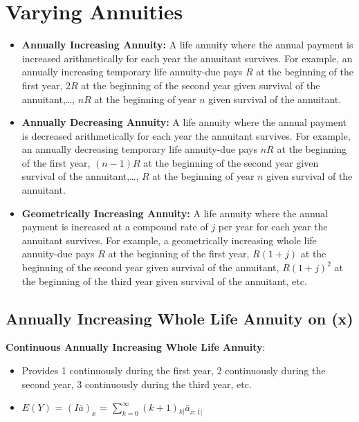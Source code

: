 \documentclass[]{book}
\begin{document}
\section{Varying Annuities}\label{varying-annuities}

\begin{itemize}
\item
  \textbf{Annually Increasing Annuity:} A life annuity where the annual
  payment is increased arithmetically for each year the annuitant
  survives. For example, an annually increasing temporary life
  annuity-due pays \(R\) at the beginning of the first year, \(2R\) at
  the beginning of the second year given survival of the
  annuitant,\ldots{}, \(nR\) at the beginning of year \(n\) given
  survival of the annuitant.
\item
  \textbf{Annually Decreasing Annuity:} A life annuity where the annual
  payment is decreased arithmetically for each year the annuitant
  survives. For example, an annually decreasing temporary life
  annuity-due pays \(nR\) at the beginning of the first year,
  \((n - 1)R\) at the beginning of the second year given survival of the
  annuitant,\ldots{}, \(R\) at the beginning of year \(n\) given
  survival of the annuitant.
\item
  \textbf{Geometrically Increasing Annuity:} A life annuity where the
  annual payment is increased at a compound rate of \(j\) per year for
  each year the annuitant survives. For example, a geometrically
  increasing whole life annuity-due pays \(R\) at the beginning of the
  first year, \(R(1 +j)\) at the beginning of the second year given
  survival of the annuitant, \(R(1 +j)^2\) at the beginning of the third
  year given survival of the annuitant, etc.
\end{itemize}

\subsection{Annually Increasing Whole Life Annuity on
(x)}\label{annually-increasing-whole-life-annuity-on-x}

\textbf{Continuous Annually Increasing Whole Life Annuity}:

\begin{itemize}
\item
  Provides 1 continuously during the first year, 2 continuously during
  the second year, 3 continuously during the third year, etc.
\item
  \(E(Y)\) = \((I\bar{a})_{x}\) =
  \(\sum^{\infty}_{k = 0} (k + 1){}_{k|}\bar{a}_{x:\overline{1}|}\)
\end{itemize}
\end{document}
